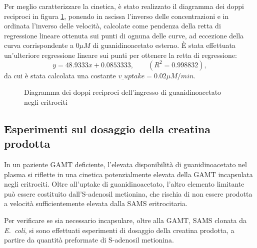 	Per meglio caratterizzare la cinetica, \`e stato realizzato il diagramma dei doppi reciproci in figura \ref{fig:gaalineweaver}, ponendo in ascissa l'inverso delle concentrazioni e in ordinata l'inverso delle velocit\`a, calcolate come pendenza della retta di regressione lineare ottenuta sui punti di ognuna delle curve, ad eccezione della curva corrispondente a $0\mu M$ di guanidinoacetato esterno.
	\`E stata effettuata un'ulteriore regressione lineare sui punti per ottenere la retta di regressione:
	\begin{equation*}
		y = 48.9333 x + 0.0853333, \qquad(R^2 = 0.998832),
	\end{equation*}
	da cui \`e stata calcolata una costante $v\_uptake = 0.02 \mu M/min$.
		
		\begin{figure}
			\center
			\caption{Diagramma dei doppi reciproci dell'ingresso di guanidinoacetato negli eritrociti}
			\label{fig:gaalineweaver}
		\end{figure}
	
	\subsection{Esperimenti sul dosaggio della creatina prodotta}\label{sez:dosaggio}
		In un paziente GAMT deficiente, l'elevata disponibilit\`a di guanidinoacetato nel plasma si riflette in una cinetica potenzialmente elevata della GAMT incapsulata negli eritrociti.
		Oltre all'uptake di guanidinoacetato, l'altro elemento limitante pu\`o essere costituito dall'S-adenosil metionina, che rischia di non essere prodotta a velocit\`a sufficientemente elevata dalla SAMS eritrocitaria.
		
		Per verificare se sia necessario incapsulare, oltre alla GAMT, SAMS clonata da \emph{E.\ coli}, si sono effettuati esperimenti di dosaggio della creatina prodotta, a partire da quantit\`a preformate di S-adenosil metionina.
		
